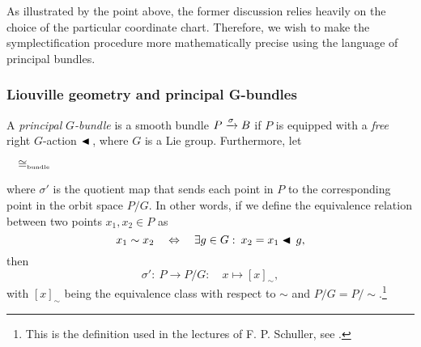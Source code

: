 As illustrated by the point above, the former discussion relies heavily on the choice of the particular coordinate chart. Therefore, we wish to make the symplectification procedure more mathematically precise using the language of principal bundles.

\subsubsection{Liouville geometry and principal G-bundles}
A \emph{principal} \(G\)\emph{-bundle} is a smooth bundle \(P\xrightarrow[]{\sigma}B\) if \(P\) is equipped with a \emph{free} right \(G\)-action \(\blacktriangleleft\,\), where \(G\) is a Lie group. Furthermore, let  
\begin{center}
    \(\quad \cong_\text{\tiny bundle} \quad \)
\end{center}
where \(\sigma'\) is the quotient map that sends each point in \(P\) to the corresponding point in the orbit space \(P/G\). In other words, if we define the equivalence relation between two points \(x_1, x_2 \in P\) as
\begin{equation}
     x_1 \sim x_2 \quad \Leftrightarrow \quad \exists g \in G:\: x_2 = x_1 \blacktriangleleft\,g,
\end{equation}
then 
\begin{equation}
     \sigma':\: P \to P/G:\quad x \mapsto [x]_\sim,
\end{equation}
with \([x]_\sim\) being the equivalence class with respect to \(\sim\) and \(P/G = P/\sim\).\footnote{This is the definition used in the lectures of F. P. Schuller, see \cite{Schuller2014}.}

